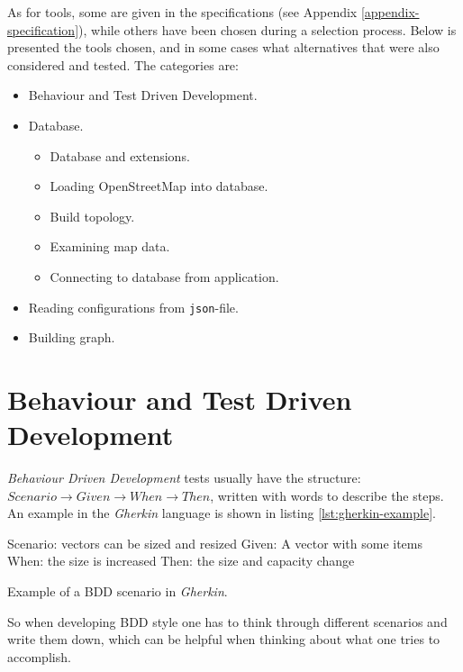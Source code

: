 \documentclass[../main.tex]{subfiles}
\begin{document}
\vspace{1em}
\noindent
As for tools, some are given in the specifications (see Appendix \ref{appendix-specification}), while others have been chosen during a selection process. Below is presented the tools chosen, and in some cases what alternatives that were also considered and tested. The categories are:

\begin{itemize}
    \item Behaviour and Test Driven Development.
    \item Database.
    \begin{itemize}
        \item Database and extensions.
        \item Loading OpenStreetMap into database.
        \item Build topology.
        \item Examining map data.
        \item Connecting to database from application.
    \end{itemize}
    \item Reading configurations from \texttt{json}-file.
    \item Building graph.
\end{itemize}


\section{Behaviour and Test Driven Development}
\emph{Behaviour Driven Development} tests usually have the structure: 
$Scenario \rightarrow Given \rightarrow When \rightarrow Then$, written with words to describe the steps. An example in the \emph{Gherkin} language is shown in listing \ref{lst:gherkin-example}.

\begin{mylisting}
\begin{gherkincode}
Scenario: vectors can be sized and resized
     Given: A vector with some items
     When:  the size is increased
     Then:  the size and capacity change
\end{gherkincode}
\caption{Example of a BDD scenario in \emph{Gherkin}.}
\label{lst:gherkin-example}
\end{mylisting}

So when developing BDD style one has to think through different scenarios and write them down, which can be helpful when thinking about what one tries to accomplish.
\end{document}
